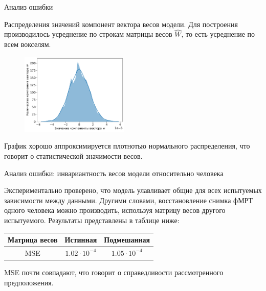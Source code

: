 \documentclass[9pt,pdf]{beamer} %
\begin{document}
\begin{frame}{Анализ ошибки}
\begin{block}{Распределения значений компонент вектора весов модели.}
Для построения производилось усреднение по строкам матрицы весов $\hat{W}$, то есть усреднение по всем вокселям.
\begin{figure}[h!]
    \centering
    \includegraphics[width=0.46\textwidth]{mean_weight_distribution.pdf}
    \label{fig:6}
\end{figure}
График хорошо аппроксимируется плотнотью нормального распределения, что говорит о статистической значимости весов.
\end{block}

\end{frame}
\begin{frame}{Анализ ошибки: инвариантность весов модели относительно человека}

Экспериментально проверено, что модель улавливает общие для всех испытуемых зависимости между данными.
Другими словами, восстановление снимка фМРТ одного человека можно производить, используя матрицу весов другого испытуемого.
Результаты представлены в таблице ниже:

	\begin{table}[h!]
		\centering
		\begin{tabular}{|c|c|c|}
			\hline
			Матрица весов	&	Истинная	&	Подмешанная \\ \hline \hline
			MSE		& 	$1.02 \cdot 10^{-4}$	 &		$1.05 \cdot 10^{-4}$ \\ \hline
		\end{tabular}
		\label{table_2}
	\end{table}
MSE почти совпадают, что говорит о справедливости рассмотренного предположения.

\end{frame}
\end{document}
